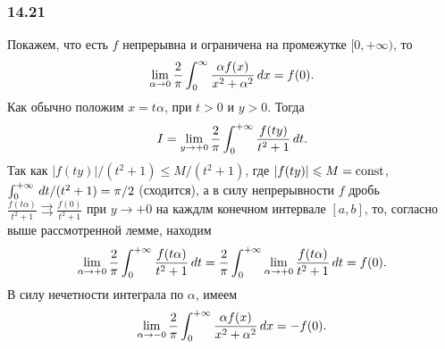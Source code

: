 \subsubsection*{14.21}
Покажем, что есть $f$ непрерывна и ограничена на промежутке $[0, +\infty)$, то
\begin{equation*}
    \lim_{\alpha \to 0} \frac{2}{\pi} \int_0^{\infty} \frac{\alpha f(x)}{x^2 + \alpha^2} \, d x = f(0).
\end{equation*}
Как обычно положим $x = t \alpha$, при $t > 0$ и $y > 0$. Тогда
\begin{equation*}
    I = \lim_{y \to + 0} \frac{2}{\pi} \int_{0}^{+\infty} \frac{f(ty)}{t^2 + 1} \, d t.
\end{equation*}
Так как $|f(ty)|/(t^2+1) \leq M/(t^2+1)$, где $|f(ty)| \leqslant M = \text{const}$, $\int_0^{+\infty} \, d t / (t^2 + 1) = \pi/2$ (сходится), а в силу непрерывности $f$ дробь $\frac{f(t\alpha)}{t^2 + 1} \rightrightarrows \frac{f(0)}{t^2 + 1}$ при $y \to + 0$ на каждлм конечном интервале $[a, b]$, то,  согласно выше рассмотренной лемме, находим
\begin{equation*}
    \lim_{\alpha \to + 0} \frac{2}{\pi} \int_0^{+\infty} \frac{f(t\alpha)}{t^2 + 1} \, d t = \frac{2}{\pi} \int_0^{+\infty} \lim_{\alpha \to +0} \frac{f(t\alpha)}{t^2 + 1} \, d t = f(0).
\end{equation*}
В силу нечетности интеграла по $\alpha$, имеем
\begin{equation*}
    \lim_{\alpha \to -0} \frac{2}{\pi} \int_0^{+\infty} \frac{\alpha f(x)}{x^2 + \alpha^2} \, d x = - f(0).
\end{equation*}